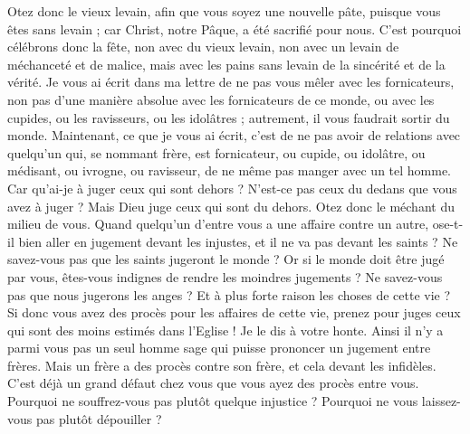 \begin{multicols}{2}
Otez donc le vieux levain, afin que vous soyez une nouvelle pâte, puisque vous êtes sans levain ; car Christ, notre Pâque, a été sacrifié pour nous.
C'est pourquoi célébrons donc la fête, non avec du vieux levain, non avec un levain de méchanceté et de malice, mais avec les pains sans levain de la sincérité et de la vérité.
Je vous ai écrit dans ma lettre de ne pas vous mêler avec les fornicateurs,
non pas d'une manière absolue avec les fornicateurs de ce monde, ou avec les cupides, ou les ravisseurs, ou les idolâtres ; autrement, il vous faudrait sortir du monde.
Maintenant, ce que je vous ai écrit, c'est de ne pas avoir de relations avec quelqu'un qui, se nommant frère, est fornicateur, ou cupide, ou idolâtre, ou médisant, ou ivrogne, ou ravisseur, de ne même pas manger avec un tel homme.
Car qu'ai-je à juger ceux qui sont dehors ? N'est-ce pas ceux du dedans que vous avez à juger ?
Mais Dieu juge ceux qui sont du dehors. Otez donc le méchant du milieu de vous.
\VerseOne{}Quand quelqu'un d'entre vous a une affaire contre un autre, ose-t-il bien aller en jugement devant les injustes, et il ne va pas devant les saints ?
Ne savez-vous pas que les saints jugeront le monde ? Or si le monde doit être jugé par vous, êtes-vous indignes de rendre les moindres jugements ?
Ne savez-vous pas que nous jugerons les anges ? Et à plus forte raison les choses de cette vie ?
Si donc vous avez des procès pour les affaires de cette vie, prenez pour juges ceux qui sont des moins estimés dans l'Eglise !
Je le dis à votre honte. Ainsi il n'y a parmi vous pas un seul homme sage qui puisse prononcer un jugement entre frères.
Mais un frère a des procès contre son frère, et cela devant les infidèles.
C'est déjà un grand défaut chez vous que vous ayez des procès entre vous. Pourquoi ne souffrez-vous pas plutôt quelque injustice ? Pourquoi ne vous laissez-vous pas plutôt dépouiller ?

\end{multicols}
